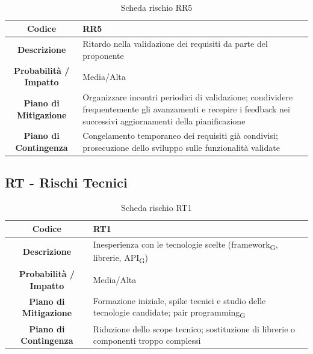 \begin{table}[H]
	\centering
	\renewcommand{\arraystretch}{1.3}
	\begin{tabularx}{\textwidth}{|c|X|}
		\hline
		\textbf{Codice} & \textbf{RR5} \\
		\hline
		\textbf{Descrizione} & Ritardo nella validazione dei requisiti da parte del proponente \\
		\hline
		\textbf{Probabilità / Impatto} & Media/Alta \\
		\hline
		\textbf{Piano di Mitigazione} & Organizzare incontri periodici di validazione; condividere frequentemente gli avanzamenti e recepire i feedback nei successivi aggiornamenti della pianificazione \\
		\hline
		\textbf{Piano di Contingenza} & Congelamento temporaneo dei requisiti già condivisi; prosecuzione dello sviluppo sulle funzionalità validate \\
		\hline
	\end{tabularx}
	\caption{Scheda rischio RR5}
\end{table}

\subsection{RT - Rischi Tecnici}
\begin{table}[H]
	\centering
	\renewcommand{\arraystretch}{1.3}
	\begin{tabularx}{\textwidth}{|c|X|}
		\hline
		\textbf{Codice} & \textbf{RT1} \\
		\hline
		\textbf{Descrizione} & Inesperienza con le tecnologie scelte (framework\textsubscript{G}, librerie, API\textsubscript{G}) \\
		\hline
		\textbf{Probabilità / Impatto} & Media/Alta \\
		\hline
		\textbf{Piano di Mitigazione} & Formazione iniziale, spike tecnici e studio delle tecnologie candidate; pair programming\textsubscript{G} \\
		\hline
		\textbf{Piano di Contingenza} & Riduzione dello scope tecnico; sostituzione di librerie o componenti troppo complessi \\
		\hline
	\end{tabularx}
	\caption{Scheda rischio RT1}
\end{table}

